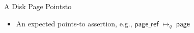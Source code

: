 \documentclass[aspectratio=169,xcolor=dvipsnames]{beamer}
\begin{document}
\begin{frame}{A Disk Page Pointsto}
      \begin{itemize}
        \item An expected points-to assertion, e.g., $\mathsf{page\_ref}\; \mapsto_{q} \;\mathsf{page}$ 
             \end{itemize}
             \begin{figure}\tiny
                 \centering
    



\begin{tikzpicture}[x=0.75pt,y=0.75pt,yscale=-0.75,xscale=0.75]


\end{tikzpicture}
\end{figure}
\end{frame}
\end{document}
